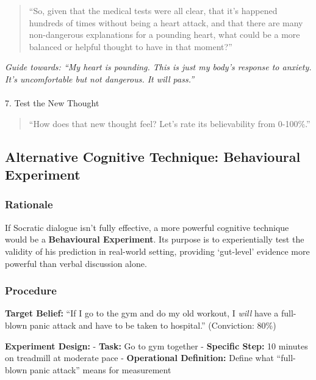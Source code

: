 \documentclass[
  american,
  11pt,
  11pt,
  letterpaper,
  onecolumn]{article}
\makeatletter
\let\oldparagraph\paragraph
\renewcommand{\paragraph}{
    \@ifstar
      \xxxParagraphStar
      \xxxParagraphNoStar
  }
\newcommand{\xxxParagraphStar}[1]{\oldparagraph*{#1}\mbox{}}
\newcommand{\xxxParagraphNoStar}[1]{\oldparagraph{#1}\mbox{}}
\makeatother
\begin{document}
\begin{quote}
``So, given that the medical tests were all clear, that it's happened
hundreds of times without being a heart attack, and that there are many
non-dangerous explanations for a pounding heart, what could be a more
balanced or helpful thought to have in that moment?''
\end{quote}

\emph{Guide towards: ``My heart is pounding. This is just my body's
response to anxiety. It's uncomfortable but not dangerous. It will
pass.''}

\paragraph{7. Test the New Thought}\label{test-the-new-thought}

\begin{quote}
``How does that new thought feel? Let's rate its believability from
0-100\%.''
\end{quote}

\subsection{Alternative Cognitive Technique: Behavioural
Experiment}\label{alternative-cognitive-technique-behavioural-experiment}

\subsubsection{Rationale}\label{rationale}

If Socratic dialogue isn't fully effective, a more powerful cognitive
technique would be a \textbf{Behavioural Experiment}. Its purpose is to
experientially test the validity of his prediction in real-world
setting, providing `gut-level' evidence more powerful than verbal
discussion alone.

\subsubsection{Procedure}\label{procedure}

\textbf{Target Belief:} ``If I go to the gym and do my old workout, I
\emph{will} have a full-blown panic attack and have to be taken to
hospital.'' (Conviction: 80\%)

\textbf{Experiment Design:} - \textbf{Task:} Go to gym together -
\textbf{Specific Step:} 10 minutes on treadmill at moderate pace -
\textbf{Operational Definition:} Define what ``full-blown panic attack''
means for measurement
\end{document}
